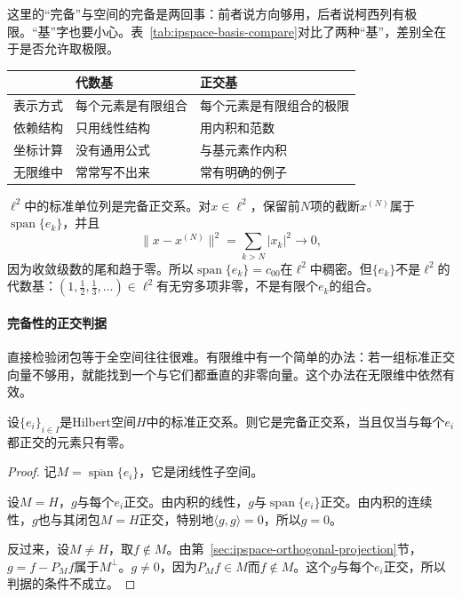 这里的“完备”与空间的完备是两回事：前者说方向够用，后者说柯西列有极限。“基”字也要小心。表~\ref{tab:ipspace-basis-compare}对比了两种“基”，差别全在于是否允许取极限。

\begin{BookInlineTable}
  \centering
  \begin{tabular}{@{}p{20mm}p{38mm}p{44mm}@{}}
    \toprule
     & 代数基 & 正交基\\
    \midrule
    表示方式 & 每个元素是有限组合 & 每个元素是有限组合的极限\\
    依赖结构 & 只用线性结构 & 用内积和范数\\
    坐标计算 & 没有通用公式 & 与基元素作内积\\
    无限维中 & 常常写不出来 & 常有明确的例子\\
    \bottomrule
  \end{tabular}
  \caption{代数基与正交基的对比。}
  \label{tab:ipspace-basis-compare}
\end{BookInlineTable}

$\ell^2$中的标准单位列是完备正交系。对$x\in\ell^2$，保留前$N$项的截断$x^{(N)}$属于$\operatorname{span}\{e_k\}$，并且
\[
 \lVert x-x^{(N)}\rVert^2=\sum_{k>N}\lvert x_k\rvert^2\to0,
\]
因为收敛级数的尾和趋于零。所以$\operatorname{span}\{e_k\}=c_{00}$在$\ell^2$中稠密。但$\{e_k\}$不是$\ell^2$的代数基：$(1,\tfrac12,\tfrac13,\ldots)\in\ell^2$有无穷多项非零，不是有限个$e_k$的组合。

\paragraph{完备性的正交判据}
直接检验闭包等于全空间往往很难。有限维中有一个简单的办法：若一组标准正交向量不够用，就能找到一个与它们都垂直的非零向量。这个办法在无限维中依然有效。

\begin{theorem}[完备正交系的判据]
\label{thm:ipspace-completeness-criterion}
设$\{e_i\}_{i\in I}$是Hilbert空间$H$中的标准正交系。则它是完备正交系，当且仅当与每个$e_i$都正交的元素只有零。
\end{theorem}

\begin{proof}
记$M=\overline{\operatorname{span}}\{e_i\}$，它是闭线性子空间。

设$M=H$，$g$与每个$e_i$正交。由内积的线性，$g$与$\operatorname{span}\{e_i\}$正交。由内积的连续性，$g$也与其闭包$M=H$正交，特别地$\langle g,g\rangle=0$，所以$g=0$。

反过来，设$M\neq H$，取$f\notin M$。由第~\ref{sec:ipspace-orthogonal-projection}节，$g=f-P_Mf$属于$M^\perp$。$g\neq0$，因为$P_Mf\in M$而$f\notin M$。这个$g$与每个$e_i$正交，所以判据的条件不成立。
\end{proof}

